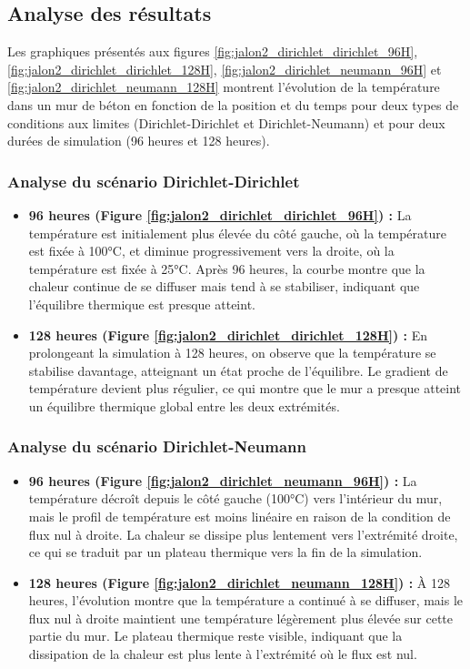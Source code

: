 \documentclass[a4paper,11pt]{article}
\begin{document}
\newpage
\subsection{Analyse des résultats}
Les graphiques présentés aux figures \ref{fig:jalon2_dirichlet_dirichlet_96H}, \ref{fig:jalon2_dirichlet_dirichlet_128H}, \ref{fig:jalon2_dirichlet_neumann_96H} et \ref{fig:jalon2_dirichlet_neumann_128H} montrent l'évolution de la température dans un mur de béton en fonction de la position et du temps pour deux types de conditions aux limites (Dirichlet-Dirichlet et Dirichlet-Neumann) et pour deux durées de simulation (96 heures et 128 heures).

\subsubsection{Analyse du scénario Dirichlet-Dirichlet}
\begin{itemize}
    \item \textbf{96 heures (Figure \ref{fig:jalon2_dirichlet_dirichlet_96H}) :} La température est initialement plus élevée du côté gauche, où la température est fixée à 100°C, et diminue progressivement vers la droite, où la température est fixée à 25°C. Après 96 heures, la courbe montre que la chaleur continue de se diffuser mais tend à se stabiliser, indiquant que l'équilibre thermique est presque atteint.
    \item \textbf{128 heures (Figure \ref{fig:jalon2_dirichlet_dirichlet_128H}) :} En prolongeant la simulation à 128 heures, on observe que la température se stabilise davantage, atteignant un état proche de l'équilibre. Le gradient de température devient plus régulier, ce qui montre que le mur a presque atteint un équilibre thermique global entre les deux extrémités.
\end{itemize}

\subsubsection{Analyse du scénario Dirichlet-Neumann}
\begin{itemize}
    \item \textbf{96 heures (Figure \ref{fig:jalon2_dirichlet_neumann_96H}) :} La température décroît depuis le côté gauche (100°C) vers l'intérieur du mur, mais le profil de température est moins linéaire en raison de la condition de flux nul à droite. La chaleur se dissipe plus lentement vers l'extrémité droite, ce qui se traduit par un plateau thermique vers la fin de la simulation.
    \item \textbf{128 heures (Figure \ref{fig:jalon2_dirichlet_neumann_128H}) :} À 128 heures, l'évolution montre que la température a continué à se diffuser, mais le flux nul à droite maintient une température légèrement plus élevée sur cette partie du mur. Le plateau thermique reste visible, indiquant que la dissipation de la chaleur est plus lente à l'extrémité où le flux est nul.
\end{itemize}
\end{document}

